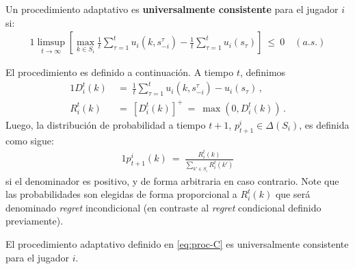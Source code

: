 \begin{definition}
\label{def:proc-univ-consistente}
Un procedimiento adaptativo es \textbf{universalmente consistente} para el jugador $i$ si:
\begin{alignat}{1}
	\limsup_{t \rightarrow \infty } \left[ \max_{k \in S_i} \frac{1}{t} \sum_{\tau = 1}^{t} u_i(k, s_{-i}^{\tau}) - \frac{1}{t} \sum_{\tau = 1}^{t} u_i(s_{\tau}) \right]\ \leq\ 0\quad (a. s.)
\end{alignat}
\end{definition}
El procedimiento es definido a continuación. A tiempo $t$, definimos
\begin{alignat}{1}
D_i^t(k)\ &=\ \frac{1}{t} \sum_{\tau = 1}^{t} u_i(k, s_{-i}^{\tau}) - u_i(s_{\tau}) \,, \\
R_i^t(k)\ &=\ [D_i^t(k)]^+\ =\ \max(0, D_i^t(k)) \,.
\end{alignat}
Luego, la distribución de probabilidad a tiempo $t+1$, $p_{t+1}^i \in \Delta(S_i)$, es definida como sigue:
\begin{alignat}{1}
\label{eq:proc-C}
  p_{t+1}^i(k)\ =\ \frac{R_i^t(k)}{\sum_{k'\in S_i} R_i^t(k')}
\end{alignat}
si el denominador es positivo, y de forma arbitraria en caso contrario. Note que las probabilidades son elegidas de forma proporcional a $R_i^t(k)$ que será denominado \textit{regret} incondicional (en contraste al \textit{regret} condicional definido previamente).

\begin{theorem}
\label{theo:conv-proc-C}
El procedimiento adaptativo definido en \eqref{eq:proc-C} es universalmente consistente para el jugador $i$.
\end{theorem}

